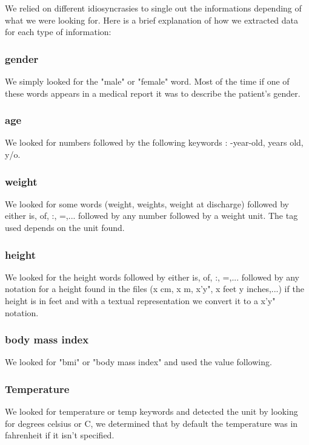 \documentclass{eplDoc}
\begin{document}
We relied on different idiosyncrasies to single out the informations depending of what we were looking for. Here is a brief explanation of how we extracted data for each type of information: 

\subsubsection{gender}
We simply looked for the "male" or "female" word. Most of the time if one of these words appears in a medical report it was to describe the patient's gender. 

\subsubsection{age}

We looked for numbers followed by the following keywords : -year-old, years old, y/o.

\subsubsection{weight}

We looked for some words (weight, weights, weight at discharge) followed by either is, of, :, =,... followed by any number followed by a weight unit. The tag used depends on the unit found. 

\subsubsection{height}

We looked for the height words followed by either is, of, :, =,... followed by any notation for a height found in the files (x cm, x m, x'y", x feet y inches,...) if the height is in feet and with a textual representation we convert it to a x'y" notation. 

\subsubsection{body mass index}

We looked for "bmi" or "body mass index" and used the value following. 

\subsubsection{Temperature}

We looked for temperature or temp keywords and detected the unit by looking for degrees celsius or C, we determined that by default the temperature was in fahrenheit if it isn't specified. 
\end{document}
